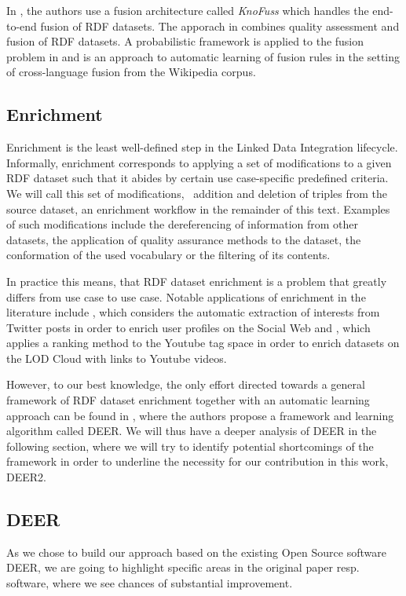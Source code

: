 In \cite{nikolov:2007a,nikolov:2008a,nikolov:2008b}, the authors use a fusion architecture called \emph{KnoFuss} which handles the end-to-end fusion of \ac{RDF} datasets.
The apporach in \cite{mendes:2012a} combines quality assessment and fusion of \ac{RDF} datasets.
A probabilistic framework is applied to the fusion problem in\cite{dong:2014a} and \cite{bryl:2014a} is an approach to automatic learning of fusion rules in the setting of cross-language fusion from the Wikipedia corpus.

\subsection{Enrichment}
\label{ssec:enrichment}

Enrichment is the least well-defined step in the Linked Data Integration lifecycle.
Informally, enrichment corresponds to applying a set of modifications to a given \ac{RDF} dataset such that it abides by certain use case-specific predefined criteria.
We will call this set of modifications, \ie~addition and deletion of triples from the source dataset, an enrichment workflow in the remainder of this text.
Examples of such modifications include the dereferencing of information from other datasets, the application of quality assurance methods to the dataset, the conformation of the used vocabulary or the filtering of its contents.

In practice this means, that \ac{RDF} dataset enrichment is a problem that greatly differs from use case to use case. 
Notable applications of enrichment in the literature include \cite{abel:2011a}, which considers the automatic extraction of interests from Twitter posts in order to enrich user profiles on the Social Web and \cite{choudhury:2009a}, which applies a ranking method to the Youtube tag space in order to enrich datasets on the \ac{LOD} Cloud with links to Youtube videos.

However, to our best knowledge, the only effort directed towards a general framework of \ac{RDF} dataset enrichment together with an automatic learning approach can be found in \cite{sherif:2015a}, where the authors propose a framework and learning algorithm called \ac{DEER}.
We will thus have a deeper analysis of \ac{DEER} in the following section, where we will try to identify potential shortcomings of the framework in order to underline the necessity for our contribution in this work, \ac{DEER2}.

\subsection{DEER}
\label{ssec:deer}
As we chose to build our approach based on the existing Open Source software \ac{DEER}, we are going to highlight specific areas in the original paper resp.\, software, where we see chances of substantial improvement.

